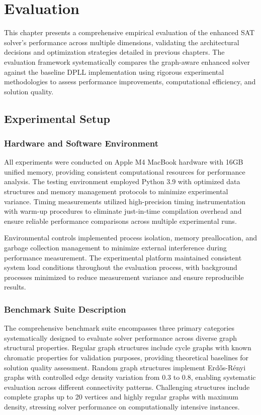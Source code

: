 \section{Evaluation}

This chapter presents a comprehensive empirical evaluation of the enhanced SAT solver's performance across multiple dimensions, validating the architectural decisions and optimization strategies detailed in previous chapters. The evaluation framework systematically compares the graph-aware enhanced solver against the baseline DPLL implementation using rigorous experimental methodologies to assess performance improvements, computational efficiency, and solution quality.

\subsection{Experimental Setup}

\subsubsection{Hardware and Software Environment}

All experiments were conducted on Apple M4 MacBook hardware with 16GB unified memory, providing consistent computational resources for performance analysis. The testing environment employed Python 3.9 with optimized data structures and memory management protocols to minimize experimental variance. Timing measurements utilized high-precision timing instrumentation with warm-up procedures to eliminate just-in-time compilation overhead and ensure reliable performance comparisons across multiple experimental runs.

Environmental controls implemented process isolation, memory preallocation, and garbage collection management to minimize external interference during performance measurement. The experimental platform maintained consistent system load conditions throughout the evaluation process, with background processes minimized to reduce measurement variance and ensure reproducible results.

\subsubsection{Benchmark Suite Description}

The comprehensive benchmark suite encompasses three primary categories systematically designed to evaluate solver performance across diverse graph structural properties. Regular graph structures include cycle graphs with known chromatic properties for validation purposes, providing theoretical baselines for solution quality assessment. Random graph structures implement Erdős-Rényi graphs with controlled edge density variation from 0.3 to 0.8, enabling systematic evaluation across different connectivity patterns. Challenging structures include complete graphs up to 20 vertices and highly regular graphs with maximum density, stressing solver performance on computationally intensive instances.

